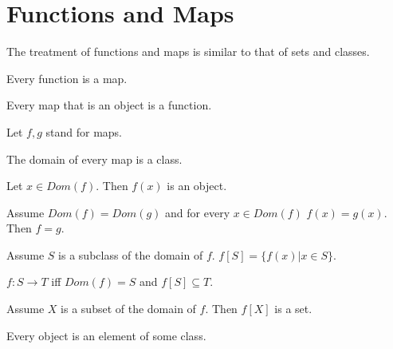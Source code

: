 \documentclass[11pt]{article}
\begin{document}
\section{Functions and Maps}
The treatment of functions and maps is similar to that
of sets and classes.
\begin{forthel}

\begin{lemma} Every function is a map.
\end{lemma}

\begin{lemma} Every map that is an object is a function.
\end{lemma}

Let $f,g$ stand for maps.

\begin{lemma} The domain of every map is a class.
\end{lemma}

\begin{lemma} Let $x \in Dom(f)$. Then $f(x)$ is an object.
\end{lemma}

\begin{lemma}  Assume $Dom(f)=Dom(g)$ and for every $x \in Dom(f)$
$f(x)=g(x)$. Then $f=g$.
\end{lemma}

\begin{definition}
Assume $S$ is a subclass of the domain of $f$.
$f[S] = \{ f(x) | x \in S \}$.
\end{definition}

\begin{definition}
$f : S \rightarrow T$ iff $Dom (f) = S$ and $f[S] \subseteq T$.
\end{definition}

\begin{axiom} 
Assume $X$ is a subset of the domain of $f$.
Then $f[X]$ is a set.
\end{axiom}

\begin{axiom}
Every object is an element of some class.
\end{axiom}
\end{forthel}
\end{document}

